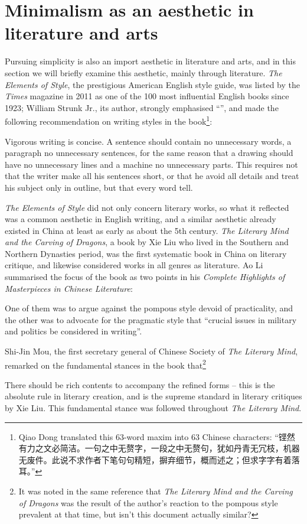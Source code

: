 \section{Minimalism as an aesthetic in literature and arts}\label{sec:art}

Pursuing simplicity is also an import aesthetic in literature and arts,
and in this section we will briefly examine this aesthetic, mainly through
literature.  \emph{The Elements of Style}, the prestigious American English
style guide, was listed by the \emph{Times} magazine in 2011 as one of the
100 most influential English books since 1923; William Strunk Jr., its author,
strongly emphasised ``'', and made the following
recommendation on writing styles in the book\footnote{Qiao Dong translated
this 63-word maxim into 63 Chinese characters:
``铿然有力之文必简洁。一句之中无赘字，一段之中无赘句，犹如丹青无冗枝，机器
无废件。此说不求作者下笔句句精短，摒弃细节，概而述之；但求字字有着落耳。''}:
\begin{quoting}
	Vigorous writing is concise.  A sentence should contain no
	unnecessary words, a paragraph no unnecessary sentences, for the
	same reason that a drawing should have no unnecessary lines and
	a machine no unnecessary parts.  This requires not that the writer
	make all his sentences short, or that he avoid all details and
	treat his subject only in outline, but that every word tell.
\end{quoting}

\emph{The Elements of Style} did not only concern literary works, so what it
reflected was a common aesthetic in English writing, and a similar aesthetic
already existed in China at least as early as about the 5th century.  \emph{The
Literary Mind and the Carving of Dragons}, a book by Xie Liu who lived in
the Southern and Northern Dynasties period, was the first systematic book in
China on literary critique, and likewise considered works in all genres as
literature.  Ao Li summarised the focus of the book as two points in his
\emph{Complete Highlights of Masterpieces in Chinese Literature}:
\begin{quoting}
	One of them was to argue against the pompous style devoid of practicality,
	and the other was to advocate for the pragmatic style that ``crucial
	issues in military and politics be considered in writing''.
\end{quoting}
Shi-Jin Mou, the first secretary general of Chinese Society of
\emph{The Literary Mind}, remarked on the fundamental stances in the
book that\footnote{It was noted in the same
reference that \emph{The Literary Mind and the Carving of Dragons}
was the result of the author's reaction to the pompous style
prevalent at that time, but isn't this document actually similar?}
\begin{quoting}
	There should be rich contents to accompany the refined forms --
	this is the absolute rule in literary creation, and is the supreme
	standard in literary critiques by Xie Liu.  This fundamental
	stance was followed throughout \emph{The Literary Mind}.
\end{quoting}

